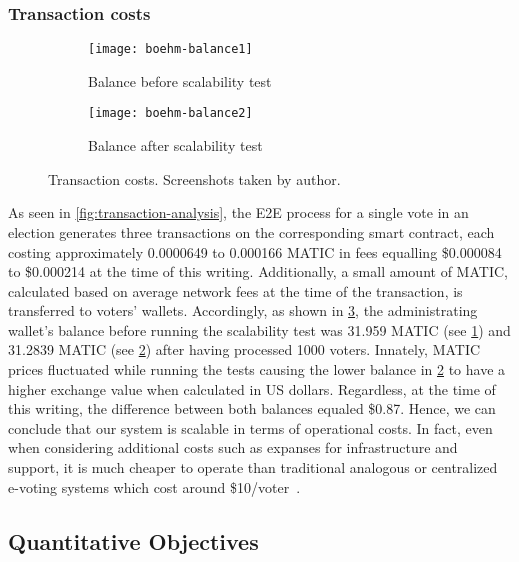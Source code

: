 \subsubsection{Transaction costs}\label{subsubsec:res-transaction-costs}

\begin{figure}[h]
    \begin{subfigure}[b]{0.5\textwidth}
        \centering
        \texttt{[image: boehm-balance1]}
        \caption{Balance before scalability test}
        \label{fig:balance-before}
    \end{subfigure}
    \begin{subfigure}[b]{0.5\textwidth}
        \centering
        \texttt{[image: boehm-balance2]}
        \caption{Balance after scalability test}
        \label{fig:balance-after}
    \end{subfigure}
    \caption{Transaction costs. Screenshots taken by author.}
    \label{fig:transaction-costs}
\end{figure}

As seen in \cref{fig:transaction-analysis}, the \gls{E2E} process for a single vote in an election generates three transactions on the corresponding smart contract, each costing approximately 0.0000649 to 0.000166 MATIC in fees equalling \$0.000084 to \$0.000214 at the time of this writing.
Additionally, a small amount of MATIC, calculated based on average network fees at the time of the transaction, is transferred to voters' wallets.
Accordingly, as shown in \cref{fig:transaction-costs}, the administrating wallet's balance before running the scalability test was 31.959 MATIC (see \cref{fig:balance-before}) and 31.2839 MATIC (see \cref{fig:balance-after}) after having processed 1000 voters.
Innately, MATIC prices fluctuated while running the tests causing the lower balance in \cref{fig:balance-after} to have a higher exchange value when calculated in US dollars.
Regardless, at the time of this writing, the difference between both balances equaled \$0.87.
Hence, we can conclude that our system is scalable in terms of operational costs.
In fact, even when considering additional costs such as expanses for infrastructure and support, it is much cheaper to operate than traditional analogous or centralized e-voting systems which cost around \$10/voter~\autocite{mohr_how_nodate}.


\subsection{Quantitative Objectives}\label{subsec:res-quantitaive-objectives}

